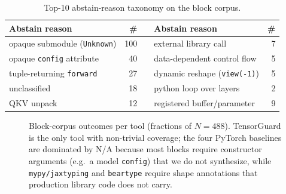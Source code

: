 \begin{table}[t]
\centering
\caption{Top-10 abstain-reason taxonomy on the block corpus.}
\label{tab:F-abstain}
\small
\begin{tabular}{lr l lr}
\toprule
Abstain reason & \# & & Abstain reason & \# \\
\midrule
opaque submodule (\texttt{Unknown})       & 100 & & external library call    &  7 \\
opaque \texttt{config} attribute          &  40 & & data-dependent control flow &  5 \\
tuple-returning \texttt{forward}          &  27 & & dynamic reshape (\texttt{view(-1)}) &  5 \\
unclassified                              &  18 & & python loop over layers  &  2 \\
QKV unpack                                &  12 & & registered buffer/parameter &  9 \\
\bottomrule
\end{tabular}
\end{table}

\begin{figure}[t]
\centering
{}
\caption{Block-corpus outcomes per tool (fractions of $N{=}488$).
TensorGuard is the only tool with non-trivial coverage; the four
PyTorch baselines are dominated by \textsc{N/A} because most blocks
require constructor arguments (e.g.\ a model \texttt{config}) that we
do not synthesize, while \texttt{mypy/jaxtyping} and \texttt{beartype}
require shape annotations that production library code does not
carry.}
\label{fig:F-blocks}
\end{figure}

